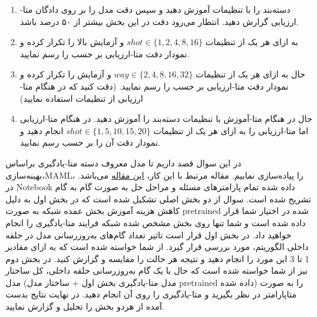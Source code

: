 \documentclass{article}
\begin{document}
\begin{enumerate}


\item
دسته‌بند را با تنظیمات
آموزش دهید و سپس دقت مدل را بر روی دادگان متا-ارزیابی گزارش دهید.
انتظار می‌رود دقت در این بخش بیشتر از ۵۰ درصد باشد.

\item
به ازای هر یک از تنظیمات
$shot \in \{1, 2, 4, 8, 16\}$
و
آزمایش بالا را تکرار کرده و نمودار دقت متا-ارزیابی بر حسب
را رسم نمایید.

\item
حال به ازای هر یک از تنظیمات
$way \in \{2, 4, 8, 16, 32\}$
و
آزمایش را تکرار کرده و نمودار دقت متا-ارزیابی بر حسب
را رسم نمایید.
(دقت کنید که در هنگام متا-ارزیابی از تنظیمات
استفاده نمایید)


\item
حال در هنگام متا-آموزش با تنظیمات
دسته‌بند را آموزش دهید.
در هنگام متا-ارزیابی اما متا-ارزیابی را به ازای هر یک از تنظیمات
$shot \in \{1, 5,10, 15, 20\} $
انجام دهید و نمودار دقت آن را بر حسب 
رسم نمایید.

\end{enumerate}




در این سوال قصد داریم تا مدل معروف دسته متا-یادگیری براساس بهینه‌سازی،‌MAML،‌ را پیاده‌سازی نماییم. مقاله مرتبط با این کار،
\href{https://arxiv.org/pdf/1703.03400}{این مقاله}
می‌باشد. در Notebook داده شده تمام پارامترهای مسئله و مراحل حل به صورت گام به گام تشریح شده است.
سوال از دو بخش اصلی تشکیل شده است که در بخش اول به دلیل کاهش هزینه آموزش بخش عمده شبکه به صورت pretrained شده در اختیار شما قرار داده شده است و شما تنها روی بخش مشخص شده شبکه فرایند متا-یادگیری را انجام خواهید داد. در بخش اول قرار است تاثیر تعداد گام‌های به‌روزرسانی مدل در حلقه داخلی الگوریتم، مورد بررسی قرار گیرد. از شما خواسته شده است که به ازای مقادیر 1 تا 3 این مورد را انجام دهید و نتیجه هر حالت را مقایسه و گزارش کنید. در بخش دوم نیز از شما خواسته شده است که حال با یک گام به‌روزرسانی حلقه داخلی‌، کل ساختار مدل (مدل متا-یادگیری بخش اول + ساختار مدل pretrained داده شده) را به صورت متاپارامتر در نظر بگیرید و متا-یادگیری را روی آن انجام دهید. در نهایت نتایج بدست آمده از هردو بخش را تحلیل و گزارش نمایید.
\end{document}
